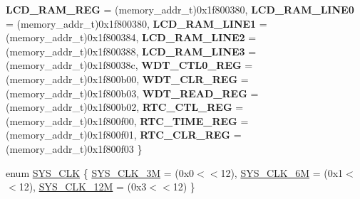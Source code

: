 \begin{DoxyCompactItemize}
{\bfseries L\+C\+D\+\_\+\+R\+A\+M\+\_\+\+R\+EG} = (memory\+\_\+addr\+\_\+t)0x1f800380, 
{\bfseries L\+C\+D\+\_\+\+R\+A\+M\+\_\+\+L\+I\+N\+E0} = (memory\+\_\+addr\+\_\+t)0x1f800380, 
{\bfseries L\+C\+D\+\_\+\+R\+A\+M\+\_\+\+L\+I\+N\+E1} = (memory\+\_\+addr\+\_\+t)0x1f800384, 
{\bfseries L\+C\+D\+\_\+\+R\+A\+M\+\_\+\+L\+I\+N\+E2} = (memory\+\_\+addr\+\_\+t)0x1f800388, 
{\bfseries L\+C\+D\+\_\+\+R\+A\+M\+\_\+\+L\+I\+N\+E3} = (memory\+\_\+addr\+\_\+t)0x1f80038c, 
{\bfseries W\+D\+T\+\_\+\+C\+T\+L0\+\_\+\+R\+EG} = (memory\+\_\+addr\+\_\+t)0x1f800b00, 
{\bfseries W\+D\+T\+\_\+\+C\+L\+R\+\_\+\+R\+EG} = (memory\+\_\+addr\+\_\+t)0x1f800b03, 
{\bfseries W\+D\+T\+\_\+\+R\+E\+A\+D\+\_\+\+R\+EG} = (memory\+\_\+addr\+\_\+t)0x1f800b02, 
{\bfseries R\+T\+C\+\_\+\+C\+T\+L\+\_\+\+R\+EG} = (memory\+\_\+addr\+\_\+t)0x1f800f00, 
{\bfseries R\+T\+C\+\_\+\+T\+I\+M\+E\+\_\+\+R\+EG} = (memory\+\_\+addr\+\_\+t)0x1f800f01, 
{\bfseries R\+T\+C\+\_\+\+C\+L\+R\+\_\+\+R\+EG} = (memory\+\_\+addr\+\_\+t)0x1f800f03
 \}
\item 
enum \mbox{\hyperlink{a00020_ae3a2d501b8662e11b969fb4a5e195e5b}{S\+Y\+S\+\_\+\+C\+LK}} \{ \mbox{\hyperlink{a00020_ae3a2d501b8662e11b969fb4a5e195e5baaac7754daa9ff2db35951f3539495122}{S\+Y\+S\+\_\+\+C\+L\+K\+\_\+3M}} = (0x0$<$$<$12), 
\mbox{\hyperlink{a00020_ae3a2d501b8662e11b969fb4a5e195e5bad1640aa8c46162a7551abca12293ef39}{S\+Y\+S\+\_\+\+C\+L\+K\+\_\+6M}} = (0x1$<$$<$12), 
\mbox{\hyperlink{a00020_ae3a2d501b8662e11b969fb4a5e195e5ba6c646c9a1e4c38ef0af6d576eacfb401}{S\+Y\+S\+\_\+\+C\+L\+K\+\_\+12M}} = (0x3$<$$<$12)
 \}
\end{DoxyCompactItemize}
